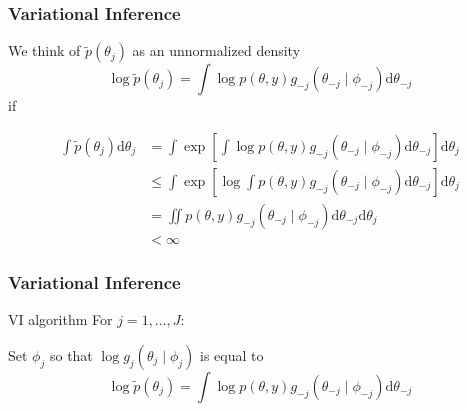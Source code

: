 \documentclass{beamer}
\begin{document}
\begin{frame}[fragile]
\frametitle{Variational Inference}

We think of $\tilde{p}(\theta_j)$ as an unnormalized density 
$$
\log\tilde{p}(\theta_j) = \int\log p(\theta, y)g_{-j}(\theta_{-j} \mid \phi_{-j}) \text{d}\theta_{-j}
$$
if

\begin{align*}
\int \tilde{p}(\theta_j) \text{d}\theta_j &= \int \exp\left[ \int\log p(\theta, y)g_{-j}(\theta_{-j} \mid \phi_{-j}) \text{d}\theta_{-j}\right] \text{d}\theta_j \\
&\le \int \exp\left[ \log \int p(\theta, y)g_{-j}(\theta_{-j} \mid \phi_{-j}) \text{d}\theta_{-j}\right] \text{d}\theta_j \tag{Jensen's}\\
&= \iint  p(\theta, y)g_{-j}(\theta_{-j} \mid \phi_{-j}) \text{d}\theta_{-j} \text{d}\theta_j \\
&< \infty
\end{align*}

\end{frame}

\begin{frame}[fragile]
\frametitle{Variational Inference}

\begin{block}{VI algorithm}
For $j=1,\ldots,J$:

Set $\phi_j$ so that $\log g_j(\theta_j \mid \phi_j)$ is equal to 
$$
\log\tilde{p}(\theta_j) = \int\log p(\theta, y)g_{-j}(\theta_{-j} \mid \phi_{-j}) \text{d}\theta_{-j}
$$
\end{block}


\end{frame}
\end{document}
